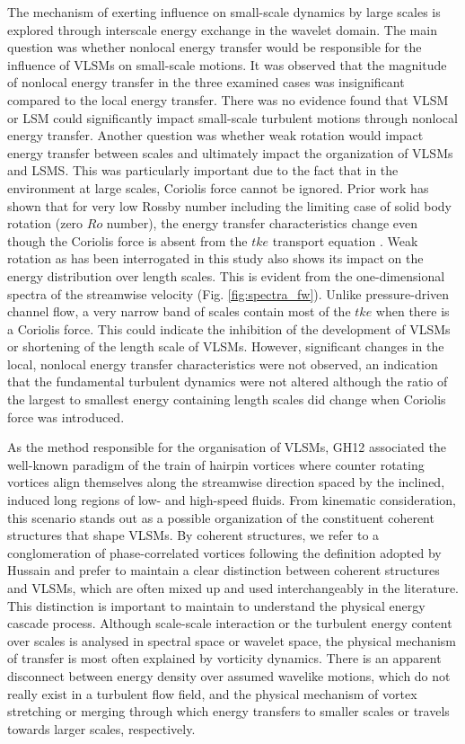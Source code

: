 The mechanism of exerting influence on small-scale dynamics by large scales is explored through interscale energy exchange in the wavelet domain. The main question was whether nonlocal energy transfer would be responsible for the influence of VLSMs on small-scale motions. It was observed that the magnitude of nonlocal energy transfer in the three examined cases was insignificant compared to the local energy transfer. There was no evidence found that VLSM or LSM could significantly impact small-scale turbulent motions through nonlocal energy transfer. Another question was whether weak rotation would impact energy transfer between scales and ultimately impact the organization of VLSMs and LSMS. This was particularly important due to the fact that in the environment at large scales, Coriolis force cannot be ignored. Prior work has shown that for very low Rossby number including the limiting case of solid body rotation (zero $Ro$ number), the energy transfer characteristics change even though the Coriolis force is absent from the $tke$ transport equation \citep{yeung_zhou_pof_98, hossain_pof_94}. Weak rotation as has been interrogated in this study also shows its impact on the energy distribution over length scales. This is evident from the one-dimensional spectra of the streamwise velocity (Fig. \ref{fig:spectra_fw}). Unlike pressure-driven channel flow, a very narrow band of scales contain most of the $tke$ when there is a Coriolis force. This could indicate the inhibition of the development of VLSMs or shortening of the length scale of VLSMs. However, significant changes in the local, nonlocal energy transfer characteristics were not observed, an indication that the fundamental turbulent dynamics were not altered although the ratio of the largest to smallest energy containing length scales did change when Coriolis force was introduced.

As the method responsible for the organisation of VLSMs, GH12 associated the well-known paradigm of the train of hairpin vortices where counter rotating vortices align themselves along the streamwise direction spaced by the inclined, induced long regions of low- and high-speed fluids. From kinematic consideration, this scenario stands out as a possible organization of the constituent coherent structures that shape VLSMs. By coherent structures, we refer to a conglomeration of phase-correlated vortices following the definition adopted by Hussain  \citep{hussain_1983_csreality} and prefer to maintain a clear distinction between coherent structures and VLSMs,  which are often mixed up and used interchangeably in the literature. This distinction is important to maintain to understand the physical energy cascade process. Although scale-scale interaction or the turbulent energy content over scales is analysed in spectral space or wavelet space, the physical mechanism of transfer is most often explained by vorticity dynamics. There is an apparent disconnect between energy density over assumed wavelike motions, which do not really exist in a turbulent flow field, and the physical mechanism of vortex stretching or merging through which energy transfers to smaller scales or travels towards larger scales, respectively. 

